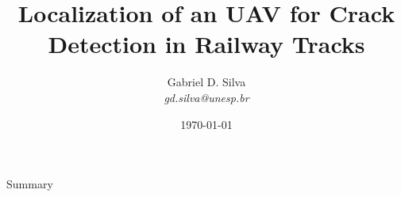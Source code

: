 \documentclass[aspectratio=169]{beamer}
\title{Localization of an UAV for Crack Detection in Railway Tracks}
\author[Gabriel D. Silva]{Gabriel D. Silva \\ {\itshape\footnotesize gd.silva@unesp.br}}
\institute[FEIS/UNESP]{São Paulo State University \\ Mechanical Engineering Departament}
\date{\today}
\begin{document}
\begin{frame}
	\titlepage
\end{frame}
\begin{frame}{Summary}
	\tableofcontents
\end{frame}






\end{document}

